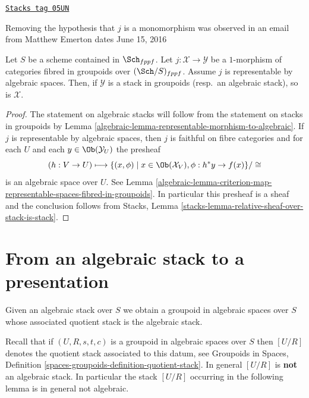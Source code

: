 \begin{lemma}
\label{algebraic-lemma-open-fibred-category-is-algebraic}
\href{https://stacks.math.columbia.edu/tag/05UN}{\texttt{Stacks tag 05UN}}

\begin{reference}
Removing the hypothesis that $j$ is a monomorphism was observed
in an email from Matthew Emerton dates June 15, 2016
\end{reference}
Let $S$ be a scheme contained in $\Sch_{fppf}$.
Let $j : \mathcal X \to \mathcal Y$ be a $1$-morphism of
categories fibred in groupoids over $(\Sch/S)_{fppf}$.
Assume $j$ is representable by algebraic spaces.
Then, if $\mathcal{Y}$ is a stack in groupoids
(resp.\ an algebraic stack), so is $\mathcal{X}$.
\end{lemma}

\begin{proof}

The statement on algebraic stacks will follow from the statement on
stacks in groupoids by Lemma \ref{algebraic-lemma-representable-morphism-to-algebraic}.
If $j$ is representable by algebraic spaces, then $j$ is
faithful on fibre categories and for each $U$ and each
$y \in \Ob(\mathcal{Y}_U)$ the presheaf
$$
(h : V \to U)
\longmapsto
\{(x, \phi) \mid x \in \Ob(\mathcal{X}_V), \phi : h^*y \to f(x)\}/\cong
$$
is an algebraic space over $U$. See
Lemma \ref{algebraic-lemma-criterion-map-representable-spaces-fibred-in-groupoids}.
In particular this presheaf is a sheaf and the conclusion follows
from Stacks, Lemma \ref{stacks-lemma-relative-sheaf-over-stack-is-stack}.
\end{proof}

\section{From an algebraic stack to a presentation}
\label{algebraic-section-stack-to-presentation}
Given an algebraic stack over $S$ we obtain a groupoid in algebraic spaces
over $S$ whose associated quotient stack is the algebraic stack.

\medskip\noindent
Recall that if $(U, R, s, t, c)$ is a groupoid in algebraic spaces over $S$
then $[U/R]$ denotes the quotient stack associated to this datum, see
Groupoids in Spaces,
Definition \ref{spaces-groupoids-definition-quotient-stack}.
In general $[U/R]$ is {\bf not} an algebraic stack. In particular the
stack $[U/R]$ occurring in the following lemma is in general not
algebraic.

